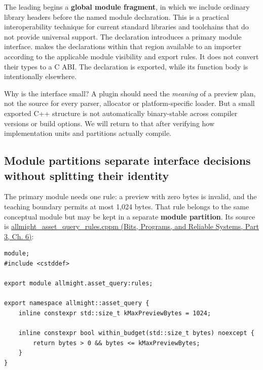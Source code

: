 The leading  begins a \textbf{global module fragment}, in which we include ordinary library headers before the named module declaration. This is a practical interoperability technique for current standard libraries and toolchains that do not provide universal  support. The  declaration introduces a primary module interface.  makes the declarations within that region available to an importer according to the applicable module visibility and export rules. It does not convert their types to a C ABI. The  declaration is exported, while its function body is intentionally elsewhere.

Why is the interface small? A plugin should need the \emph{meaning} of a preview plan, not the source for every parser, allocator or platform-specific loader. But a small exported C++ structure is not automatically binary-stable across compiler versions or build options. We will return to that after verifying how implementation units and partitions actually compile.

\subsection{Module partitions separate interface decisions without splitting their identity}\label{05-engine-i-ch006-module-partitions-separate-interface-decisions-without-splitting-their-identity}

\hypertarget{05-engine-i-ch006-module-partitions-separate-interface-decisions-without-splitting-their-identity}{}

The primary module needs one rule: a preview with zero bytes is invalid, and the teaching boundary permits at most 1,024 bytes. That rule belongs to the same conceptual module but may be kept in a separate \textbf{module partition}. Its source is \href{../01-Bits-Programs-and-Reliable-Systems-P03/main.pdf\#nameddest=source-file-b84757ff09b490e82f7f98ea}{allmight\_asset\_query\_rules.cppm (Bits, Programs, and Reliable Systems, Part 3, Ch. 6)}:

\begin{verbatim}
module;
#include <cstddef>

export module allmight.asset_query:rules;

export namespace allmight::asset_query {
    inline constexpr std::size_t kMaxPreviewBytes = 1024;

    inline constexpr bool within_budget(std::size_t bytes) noexcept {
        return bytes > 0 && bytes <= kMaxPreviewBytes;
    }
}
\end{verbatim}

